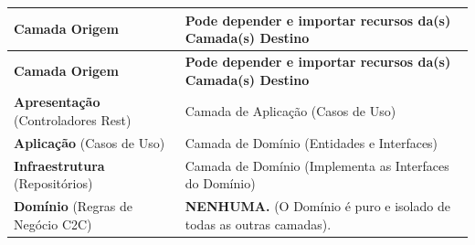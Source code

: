 ﻿\documentclass[12pt,a4paper]{article}
\begin{document}
\begin{longtable}{|p{3.5cm}|p{10.5cm}|}
\hline
\textbf{Camada Origem} & \textbf{Pode depender e importar recursos da(s) Camada(s) Destino} \\
\hline
\endfirsthead
\hline
\textbf{Camada Origem} & \textbf{Pode depender e importar recursos da(s) Camada(s) Destino} \\
\hline
\endhead
\textbf{Apresentação} (Controladores Rest) & Camada de Aplicação (Casos de Uso) \\
\hline
\textbf{Aplicação} (Casos de Uso) & Camada de Domínio (Entidades e Interfaces) \\
\hline
\textbf{Infraestrutura} (Repositórios) & Camada de Domínio (Implementa as Interfaces do Domínio) \\
\hline
\textbf{Domínio} (Regras de Negócio C2C) & \textbf{NENHUMA.} (O Domínio é puro e isolado de todas as outras camadas). \\
\hline
\end{longtable}
\end{document}

